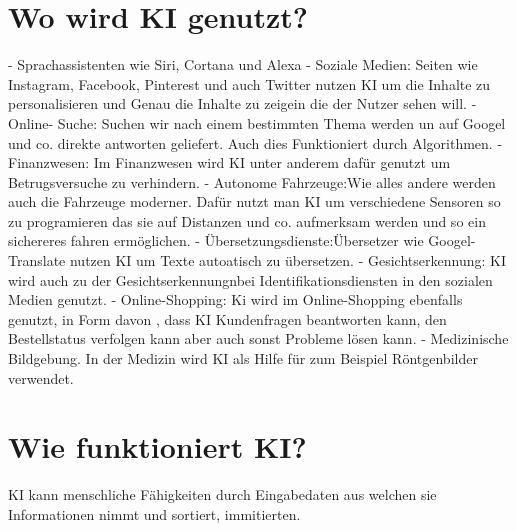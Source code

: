 \documentclass{report}
\begin{document}
\section{Wo wird KI genutzt?}
- Sprachassistenten wie Siri, Cortana und Alexa 
- Soziale Medien: Seiten wie Instagram, Facebook, Pinterest und auch Twitter nutzen KI um die Inhalte zu personalisieren und Genau die Inhalte zu zeigein die der Nutzer sehen will.
- Online- Suche: Suchen wir nach einem bestimmten Thema werden un auf Googel und co. direkte antworten geliefert. Auch dies Funktioniert durch Algorithmen.
- Finanzwesen: Im Finanzwesen wird KI unter anderem dafür genutzt um Betrugsversuche zu verhindern.
- Autonome Fahrzeuge:Wie alles andere werden auch die Fahrzeuge moderner. Dafür nutzt man KI um verschiedene Sensoren so zu programieren das sie auf Distanzen und co. aufmerksam werden und so ein sichereres fahren ermöglichen. 
- Übersetzungsdienste:Übersetzer wie Googel-Translate nutzen KI um Texte autoatisch zu übersetzen. 
- Gesichtserkennung: KI wird auch zu der Gesichtserkennungnbei Identifikationsdiensten in den sozialen Medien genutzt. 
- Online-Shopping: Ki wird im Online-Shopping ebenfalls genutzt, in Form davon , dass KI Kundenfragen beantworten kann, den Bestellstatus verfolgen kann aber auch sonst Probleme lösen kann. 
- Medizinische Bildgebung. In der Medizin wird KI als Hilfe für zum Beispiel Röntgenbilder verwendet. 

\section{Wie funktioniert KI?}
KI kann menschliche Fähigkeiten durch Eingabedaten aus welchen sie Informationen nimmt und sortiert, immitierten.
\end{document}
